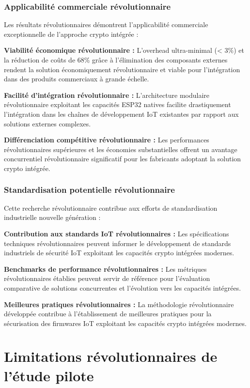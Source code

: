 \subsubsection{Applicabilité commerciale révolutionnaire}

Les résultats révolutionnaires démontrent l'applicabilité commerciale exceptionnelle de l'approche crypto intégrée :

\textbf{Viabilité économique révolutionnaire :} L'overhead ultra-minimal (< 3\%) et la réduction de coûts de 68\% grâce à l'élimination des composants externes rendent la solution économiquement révolutionnaire et viable pour l'intégration dans des produits commerciaux à grande échelle.

\textbf{Facilité d'intégration révolutionnaire :} L'architecture modulaire révolutionnaire exploitant les capacités ESP32 natives facilite drastiquement l'intégration dans les chaînes de développement IoT existantes par rapport aux solutions externes complexes.

\textbf{Différenciation compétitive révolutionnaire :} Les performances révolutionnaires supérieures et les économies substantielles offrent un avantage concurrentiel révolutionnaire significatif pour les fabricants adoptant la solution crypto intégrée.

\subsubsection{Standardisation potentielle révolutionnaire}

Cette recherche révolutionnaire contribue aux efforts de standardisation industrielle nouvelle génération :

\textbf{Contribution aux standards IoT révolutionnaires :} Les spécifications techniques révolutionnaires peuvent informer le développement de standards industriels de sécurité IoT exploitant les capacités crypto intégrées modernes.

\textbf{Benchmarks de performance révolutionnaires :} Les métriques révolutionnaires établies peuvent servir de référence pour l'évaluation comparative de solutions concurrentes et l'évolution vers les capacités intégrées.

\textbf{Meilleures pratiques révolutionnaires :} La méthodologie révolutionnaire développée contribue à l'établissement de meilleures pratiques pour la sécurisation des firmwares IoT exploitant les capacités crypto intégrées modernes.

\section{Limitations révolutionnaires de l'étude pilote}

